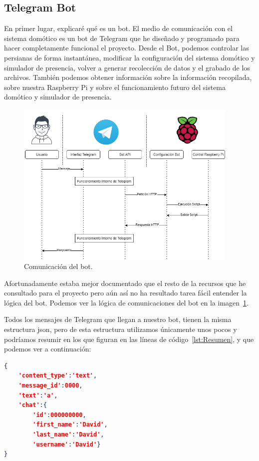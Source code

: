 \subsection{Telegram Bot}\label{5.TelegramBot}
En primer lugar, explicaré qué es un bot. El medio de comunicación con el sistema domótico es un bot de Telegram que he diseñado y programado para hacer completamente funcional el proyecto. Desde el Bot, podemos controlar las persianas de forma instantánea, modificar la configuración del sistema domótico y simulador de presencia, volver a generar recolección de datos y el grabado de los archivos. También podemos obtener información sobre la información recopilada, sobre nuestra Raspberry Pi y sobre el funcionamiento futuro del sistema domótico y simulador de presencia.
\begin{figure}
    \centering
    \includegraphics[width=0.95\textwidth]{img/Diagramas/FuncionamientoBot.png}
    \caption{Comunicación del bot. } \label{Img:FuncionamientoBot}
\end{figure}


Afortunadamente estaba mejor documentado que el resto de la recursos que he consultado para el proyecto pero aún así no ha resultado tarea fácil entender la lógica del bot. 
Podemos ver la lógica de comunicaciones del bot en la imagen~\ref{Img:FuncionamientoBot}. 

Todos los mensajes de Telegram que llegan a nuestro bot, tienen la misma estructura json, pero de esta estructura utilizamos únicamente unos pocos y podríamos resumir en los que figuran en las líneas de código~\ref{lst:Resumen}, y que podemos ver a continuación:
\begin{lstlisting}[language=json,firstnumber=0, basicstyle=\small, caption={Resumen de los datos que utilizamos del mensaje de Telegram.},label={lst:Resumen}]
{
    'content_type':'text',
    'message_id':0000,
    'text':'a',
    'chat':{
        'id':000000000,
        'first_name':'David',
        'last_name':'David',
        'username':'David'}
}
\end{lstlisting}

